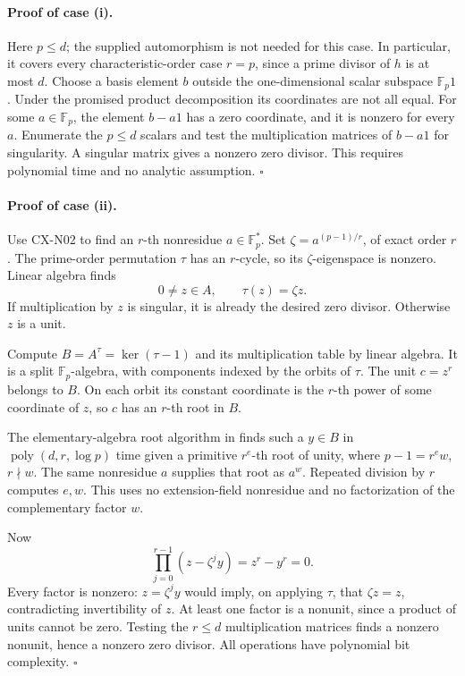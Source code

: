 \paragraph{Proof of case (i).}
Here \(p\leq d\); the supplied automorphism is not needed for
this case. In particular, it covers every characteristic-order
case \(r=p\), since a prime divisor of \(h\) is at most \(d\).
Choose a basis element \(b\) outside the one-dimensional scalar
subspace \(\mathbb F_p1\).
Under the promised product decomposition its coordinates are not
all equal.
For some \(a\in\mathbb F_p\), the element \(b-a1\) has a zero
coordinate, and it is nonzero for every \(a\).
Enumerate the \(p\leq d\) scalars and test the multiplication
matrices of \(b-a1\) for singularity.
A singular matrix gives a nonzero zero divisor.
This requires polynomial time and no analytic assumption.
\hfill\(\square\)

\paragraph{Proof of case (ii).}
Use CX-N02 to find an \(r\)-th nonresidue \(a\in\mathbb F_p^*\).
Set \(\zeta=a^{(p-1)/r}\), of exact order \(r\).
The prime-order permutation \(\tau\) has an \(r\)-cycle, so its
\(\zeta\)-eigenspace is nonzero.
Linear algebra finds
\[
 0\ne z\in A,\qquad \tau(z)=\zeta z.
\]
If multiplication by \(z\) is singular, it is already the desired
zero divisor. Otherwise \(z\) is a unit.

Compute \(B=A^\tau=\ker(\tau-1)\) and its multiplication table by
linear algebra.
It is a split \(\mathbb F_p\)-algebra, with components indexed by
the orbits of \(\tau\).
The unit \(c=z^r\) belongs to \(B\).
On each orbit its constant coordinate is the \(r\)-th power of
some coordinate of \(z\), so \(c\) has an \(r\)-th root in \(B\).

The elementary-algebra root algorithm in
\cite[\S2.4, Lemma~2.6, author pp.7--9]{CXNGao01}
finds such a \(y\in B\) in
\(\operatorname{poly}(d,r,\log p)\) time given a primitive
\(r^e\)-th root of unity, where \(p-1=r^e w\), \(r\nmid w\).
The same nonresidue \(a\) supplies that root as \(a^w\).
Repeated division by \(r\) computes \(e,w\).
This uses no extension-field nonresidue and no factorization of
the complementary factor \(w\).

Now
\[
 \prod_{j=0}^{r-1}(z-\zeta^j y)=z^r-y^r=0.
\]
Every factor is nonzero: \(z=\zeta^j y\) would imply, on applying
\(\tau\), that \(\zeta z=z\), contradicting invertibility of \(z\).
At least one factor is a nonunit, since a product of units cannot
be zero.
Testing the \(r\leq d\) multiplication matrices finds a nonzero
nonunit, hence a nonzero zero divisor.
All operations have polynomial bit complexity.
\hfill\(\square\)

